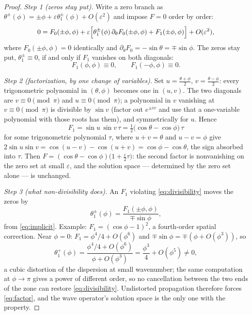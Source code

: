 \documentclass[11pt]{amsbook}
\theoremstyle{plain}
\theoremstyle{definition}
\theoremstyle{remark}
\begin{document}
\begin{proof}
\emph{Step 1 (zeros stay put).} Write a zero branch as $\theta^{\pm}(\phi) = \pm\phi + \varepsilon\theta_{1}^{\pm}(\phi) + O(\varepsilon^{2})$ and impose $F = 0$ order by order:
\begin{equation}\label{eq:implicit}
0 = F_{0}(\pm\phi, \phi) + \varepsilon\Bigl[\theta_{1}^{\pm}(\phi)\,\partial_{\theta}F_{0}(\pm\phi, \phi) + F_{1}(\pm\phi, \phi)\Bigr] + O(\varepsilon^{2}),
\end{equation}
where $F_{0}(\pm\phi,\phi) = 0$ identically and $\partial_{\theta}F_{0} = -\sin\theta = \mp\sin\phi$. The zeros stay put, $\theta_{1}^{\pm} \equiv 0$, if and only if $F_{1}$ vanishes on both diagonals:
\begin{equation}\label{eq:divisibility}
F_{1}(\phi, \phi) \equiv 0, \qquad F_{1}(-\phi, \phi) \equiv 0.
\end{equation}

\emph{Step 2 (factorization, by one change of variables).} Set $u = \tfrac{\theta + \phi}{2}$, $v = \tfrac{\theta - \phi}{2}$: every trigonometric polynomial in $(\theta, \phi)$ becomes one in $(u, v)$. The two diagonals are $v \equiv 0 \pmod{\pi}$ and $u \equiv 0 \pmod{\pi}$; a polynomial in $v$ vanishing at $v \equiv 0 \pmod{\pi}$ is divisible by $\sin v$ (factor out $e^{\pm iv}$ and use that a one-variable polynomial with those roots has them), and symmetrically for $u$. Hence
\begin{equation}\label{eq:factor}
F_{1} = \sin u \,\sin v \,\tau = \tfrac{1}{2}\bigl(\cos\theta - \cos\phi\bigr)\,\tau
\end{equation}
for some trigonometric polynomial $\tau$, where $u + v = \theta$ and $u - v = \phi$ give $2\sin u \sin v = \cos(u - v) - \cos(u + v) = \cos\phi - \cos\theta$, the sign absorbed into $\tau$. Then $F = (\cos\theta - \cos\phi)\bigl(1 + \tfrac{\varepsilon}{2}\tau\bigr)$: the second factor is nonvanishing on the zero set at small $\varepsilon$, and the solution space --- determined by the zero set alone --- is unchanged.

\emph{Step 3 (what non-divisibility does).} An $F_{1}$ violating \cref{eq:divisibility} moves the zeros by
\begin{equation}\label{eq:distortion}
\theta_{1}^{\pm}(\phi) = \frac{F_{1}(\pm\phi, \phi)}{\mp\sin\phi},
\end{equation}
from \cref{eq:implicit}. Example: $F_{1} = (\cos\phi - 1)^{2}$, a fourth-order spatial correction. Near $\phi = 0$: $F_{1} = \phi^{4}/4 + O(\phi^{6})$ and $\mp\sin\phi = \mp(\phi + O(\phi^{3}))$, so
\begin{equation}\label{eq:example}
\theta_{1}^{+}(\phi) = \frac{\phi^{4}/4 + O(\phi^{6})}{\phi + O(\phi^{3})} = \frac{\phi^{3}}{4} + O(\phi^{5}) \neq 0,
\end{equation}
a cubic distortion of the dispersion at small wavenumber; the same computation at $\phi \to \pi$ gives a power of different order, so no cancellation between the two ends of the zone can restore \cref{eq:divisibility}. Undistorted propagation therefore forces \cref{eq:factor}, and the wave operator's solution space is the only one with the property.
\end{proof}
\end{document}
